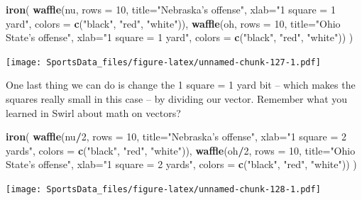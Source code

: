 \documentclass[]{book}
\newenvironment{Shaded}{\begin{snugshade}}{\end{snugshade}}
\newcommand{\DataTypeTok}[1]{\textcolor[rgb]{0.13,0.29,0.53}{#1}}
\newcommand{\DecValTok}[1]{\textcolor[rgb]{0.00,0.00,0.81}{#1}}
\newcommand{\KeywordTok}[1]{\textcolor[rgb]{0.13,0.29,0.53}{\textbf{#1}}}
\newcommand{\NormalTok}[1]{#1}
\newcommand{\OperatorTok}[1]{\textcolor[rgb]{0.81,0.36,0.00}{\textbf{#1}}}
\newcommand{\StringTok}[1]{\textcolor[rgb]{0.31,0.60,0.02}{#1}}
\begin{document}
\begin{Shaded}
\begin{Highlighting}[]
\KeywordTok{iron}\NormalTok{(}
 \KeywordTok{waffle}\NormalTok{(nu, }\DataTypeTok{rows =} \DecValTok{10}\NormalTok{, }\DataTypeTok{title=}\StringTok{"Nebraska's offense"}\NormalTok{, }\DataTypeTok{xlab=}\StringTok{"1 square = 1 yard"}\NormalTok{, }\DataTypeTok{colors =} \KeywordTok{c}\NormalTok{(}\StringTok{"black"}\NormalTok{, }\StringTok{"red"}\NormalTok{, }\StringTok{"white"}\NormalTok{)),}
 \KeywordTok{waffle}\NormalTok{(oh, }\DataTypeTok{rows =} \DecValTok{10}\NormalTok{, }\DataTypeTok{title=}\StringTok{"Ohio State's offense"}\NormalTok{, }\DataTypeTok{xlab=}\StringTok{"1 square = 1 yard"}\NormalTok{, }\DataTypeTok{colors =} \KeywordTok{c}\NormalTok{(}\StringTok{"black"}\NormalTok{, }\StringTok{"red"}\NormalTok{, }\StringTok{"white"}\NormalTok{))}
\NormalTok{)}
\end{Highlighting}
\end{Shaded}

\texttt{[image: SportsData\_files/figure-latex/unnamed-chunk-127-1.pdf]}

One last thing we can do is change the 1 square = 1 yard bit -- which makes the squares really small in this case -- by dividing our vector. Remember what you learned in Swirl about math on vectors?

\begin{Shaded}
\begin{Highlighting}[]
\KeywordTok{iron}\NormalTok{(}
 \KeywordTok{waffle}\NormalTok{(nu}\OperatorTok{/}\DecValTok{2}\NormalTok{, }\DataTypeTok{rows =} \DecValTok{10}\NormalTok{, }\DataTypeTok{title=}\StringTok{"Nebraska's offense"}\NormalTok{, }\DataTypeTok{xlab=}\StringTok{"1 square = 2 yards"}\NormalTok{, }\DataTypeTok{colors =} \KeywordTok{c}\NormalTok{(}\StringTok{"black"}\NormalTok{, }\StringTok{"red"}\NormalTok{, }\StringTok{"white"}\NormalTok{)),}
 \KeywordTok{waffle}\NormalTok{(oh}\OperatorTok{/}\DecValTok{2}\NormalTok{, }\DataTypeTok{rows =} \DecValTok{10}\NormalTok{, }\DataTypeTok{title=}\StringTok{"Ohio State's offense"}\NormalTok{, }\DataTypeTok{xlab=}\StringTok{"1 square = 2 yards"}\NormalTok{, }\DataTypeTok{colors =} \KeywordTok{c}\NormalTok{(}\StringTok{"black"}\NormalTok{, }\StringTok{"red"}\NormalTok{, }\StringTok{"white"}\NormalTok{))}
\NormalTok{)}
\end{Highlighting}
\end{Shaded}

\texttt{[image: SportsData\_files/figure-latex/unnamed-chunk-128-1.pdf]}
\end{document}
